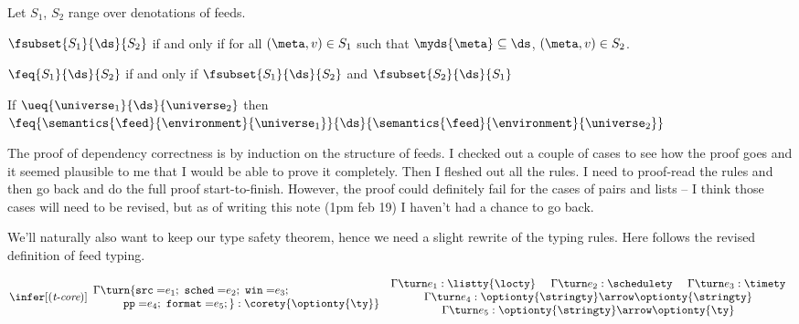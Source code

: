 Let $S_1$, $S_2$ range over denotations of feeds.

\begin{definition}
$\fsubset{S_1}{\ds}{S_2}$ if and only if for all
$(\meta,v) \in S_1$ such that
$\myds{\meta} \subseteq \ds$, $(\meta,v) \in S_2$.
\end{definition}

\begin{definition}
$\feq{S_1}{\ds}{S_2}$ if and only if 
$\fsubset{S_1}{\ds}{S_2}$ and
$\fsubset{S_2}{\ds}{S_1}$
\end{definition}

\begin{theorem}
If $\ueq{\universe_1}{\ds}{\universe_2}$ then
$\feq{\semantics{\feed}{\environment}{\universe_1}}{\ds}{\semantics{\feed}{\environment}{\universe_2}}$
\end{theorem}

The proof of dependency correctness is by induction on the structure of feeds.  I
checked out a couple of cases to see how the proof goes and it seemed plausible to
me that I would be able to prove it completely.   
Then I fleshed out all the rules.  I need to proof-read the rules and then go back
and do the full proof start-to-finish.  However, the proof could definitely
fail for the cases of pairs and lists -- I think those cases will need to be revised,
but as of writing this note (1pm feb 19) I haven't had a chance to go back.  

We'll naturally also want to keep our type safety theorem, hence we need a slight rewrite of
the typing rules.  Here follows the revised definition of feed typing.



\[
\infer[(\textit{t-core})]
{ \begin{array}{l}
  \Gamma \turn 
   \{
      \mathtt{src=} e_1;\
      \mathtt{sched=} e_2; \
      \mathtt{win=} e_3;\\ \qquad \ \ 
      \mathtt{pp=} e_4;\
      \mathtt{ format=} e_5; 
   \} 
   : \corety{\optionty{\ty}}
 \end{array}
}
{
 \begin{array}{c}
  \Gamma \turn e_1 : \listty{\locty} \quad \
  \Gamma \turn e_2 : \schedulety \quad \
  \Gamma \turn e_3 : \timety\\
  \Gamma \turn e_4 : \optionty{\stringty} \arrow \optionty{\stringty}  \\
  \Gamma \turn e_5 : \optionty{\stringty} \arrow \optionty{\ty} \\
 \end{array}
}
\]

